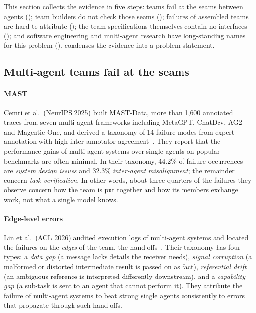 \documentclass[10pt,a4paper]{article}
\begin{document}
This section collects the evidence in five steps: teams fail at the seams
between agents (); team builders do not check those seams
(); failures of assembled teams are hard to attribute
(); the team specifications themselves contain no
interfaces (); and software engineering and multi-agent
research have long-standing names for this problem ().
 condenses the evidence into a problem statement.

\subsection{Multi-agent teams fail at the seams}\label{sec:ev-seams}

\paragraph{MAST} Cemri et al.\ (NeurIPS 2025) built MAST-Data, more than
1{,}600 annotated traces from seven multi-agent frameworks including
MetaGPT, ChatDev, AG2 and Magentic-One, and derived a taxonomy of 14
failure modes from expert annotation with high inter-annotator
agreement~\cite{cemri2025mast}. They report that the performance gains of
multi-agent systems over single agents on popular benchmarks are often
minimal. In their taxonomy, 44.2\% of failure occurrences are \emph{system
design issues} and 32.3\% \emph{inter-agent misalignment}; the remainder
concern \emph{task verification}. In other words, about three quarters of
the failures they observe concern how the team is put together and how its
members exchange work, not what a single model knows.

\paragraph{Edge-level errors} Lin et al.\ (ACL 2026) audited execution logs
of multi-agent systems and located the failures on the \emph{edges} of the
team, the hand-offs~\cite{lin2026agentask}. Their taxonomy has four types:
a \emph{data gap} (a message lacks details the receiver needs),
\emph{signal corruption} (a malformed or distorted intermediate result is
passed on as fact), \emph{referential drift} (an ambiguous reference is
interpreted differently downstream), and a \emph{capability gap} (a
sub-task is sent to an agent that cannot perform it). They attribute the
failure of multi-agent systems to beat strong single agents consistently
to errors that propagate through such hand-offs.
\end{document}
